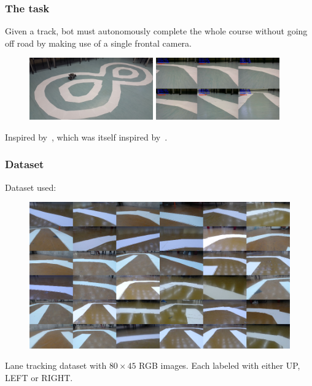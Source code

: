 \documentclass{beamer}
\begin{document}
\begin{frame}
  \frametitle{The task}

  Given a track, bot must autonomously complete the whole course without going off road by making
  use of a single frontal camera.

  \begin{figure}[h]
    \centering\includegraphics[width=0.475\textwidth]{imgs/track_1_resize.png}
    \includegraphics[width=0.475\textwidth]{imgs/demo_merged_pairs_small.png}
  \end{figure}

  Inspired by~\cite{moraes18}, which was itself inspired by~\cite{bojarski16}.
\end{frame}

\begin{frame}
  \frametitle{Dataset}

  Dataset used: \cite{moraes18}

  \begin{figure}
    \centering\includegraphics[height=0.5\textheight]{imgs/montage_raw.png}
  \end{figure}

  Lane tracking dataset with $80\times 45$ RGB images. Each labeled with either UP, LEFT or RIGHT.
\end{frame}
\end{document}
